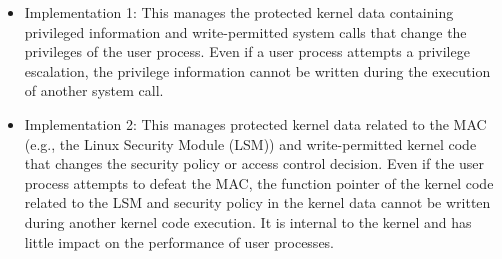 \begin{itemize}
\item Implementation 1: This manages the protected kernel data containing
privileged information and write-permitted system calls that change the
privileges of the user process. 
%
Even if a user process attempts a privilege escalation, the privilege
information cannot be written during the execution of another system call.

 

\item Implementation 2: This manages protected kernel data related to the MAC (e.g.,
the Linux Security Module (LSM)) and write-permitted kernel code that
changes the security policy or access control decision.
%
Even if the user process attempts to defeat the MAC, the function pointer of the
kernel code related to the LSM and security policy in the kernel data cannot
be written during another kernel code execution.
%
It is internal to the kernel and has little impact on the performance of user
processes.


\end{itemize}


